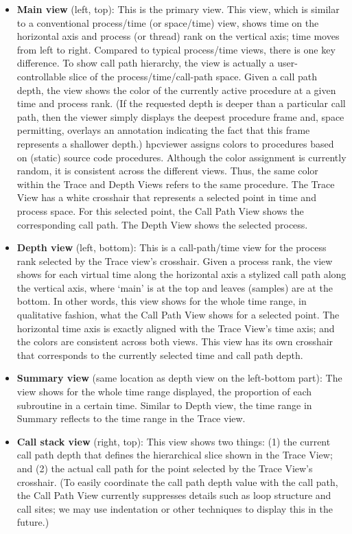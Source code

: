 \documentclass[english]{article}
\begin{document}
\begin{itemize}
\item \textbf{Main view} (left, top):
  This is the primary view.
  This view, which is similar to a conventional process/time (or space/time) view, shows time on the horizontal axis and process (or thread) rank on the vertical axis; time moves from left to right.
  Compared to typical process/time views, there is one key difference.
  To show call path hierarchy, the view is actually a user-controllable slice of the process/time/call-path space.
  Given a call path depth, the view shows the color of the currently active procedure at a given time and process rank.
  (If the requested depth is deeper than a particular call path, then the viewer simply displays the deepest procedure frame and, space permitting, overlays an annotation indicating the fact that this frame represents a shallower depth.)
  hpcviewer assigns colors to procedures based on (static) source code procedures.
  Although the color assignment is currently random, it is consistent across the different views.
  Thus, the same color within the Trace and Depth Views refers to the same procedure.
  The Trace View has a white crosshair that represents a selected point in time and process space.
  For this selected point, the Call Path View shows the corresponding call path.
  The Depth View shows the selected process.

\item \textbf{Depth view} (left, bottom):
  This is a call-path/time view for the process rank selected by the Trace view's crosshair.
  Given a process rank, the view shows for each virtual time along the horizontal axis a stylized call path along the vertical axis, where `main' is at the top and leaves (samples) are at the bottom.
  In other words, this view shows for the whole time range, in qualitative fashion, what the Call Path View shows for a selected point.
  The horizontal time axis is exactly aligned with the Trace View's time axis; and the colors are consistent across both views.
  This view has its own crosshair that corresponds to the currently selected time and call path depth.

\item \textbf{Summary view} (same location as depth view on the left-bottom part):
  The view shows for the whole time range displayed, the proportion of each subroutine in a certain time.
  Similar to Depth view, the time range in Summary reflects to the time range in the Trace view.

\item \textbf{Call stack view} (right, top):
  This view shows two things: (1) the current call path depth that defines the hierarchical slice shown in the Trace View; and (2) the actual call path for the point selected by the Trace View's crosshair.
  (To easily coordinate the call path depth value with the call path, the Call Path View currently suppresses details such as loop structure and call sites; we may use indentation or other techniques to display this in the future.)


\end{itemize}
\end{document}

